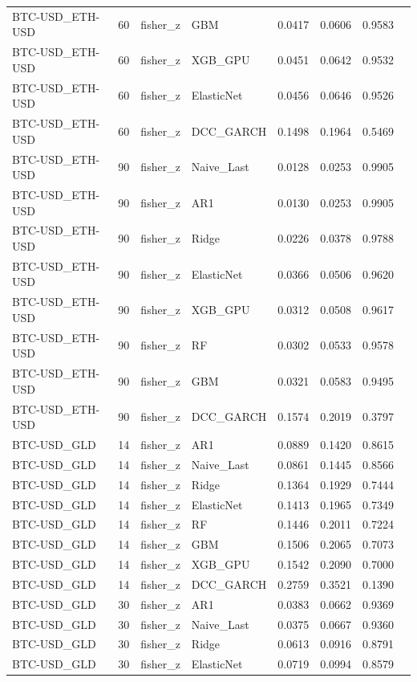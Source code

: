 \begin{table}[H]
\begin{tabular}{llllrrrr}
BTC-USD_ETH-USD & 60 & fisher_z & GBM & 0.0417 & 0.0606 & 0.9583 &  \\
BTC-USD_ETH-USD & 60 & fisher_z & XGB_GPU & 0.0451 & 0.0642 & 0.9532 &  \\
BTC-USD_ETH-USD & 60 & fisher_z & ElasticNet & 0.0456 & 0.0646 & 0.9526 &  \\
BTC-USD_ETH-USD & 60 & fisher_z & DCC_GARCH & 0.1498 & 0.1964 & 0.5469 &  \\
BTC-USD_ETH-USD & 90 & fisher_z & Naive_Last & 0.0128 & 0.0253 & 0.9905 &  \\
BTC-USD_ETH-USD & 90 & fisher_z & AR1 & 0.0130 & 0.0253 & 0.9905 &  \\
BTC-USD_ETH-USD & 90 & fisher_z & Ridge & 0.0226 & 0.0378 & 0.9788 &  \\
BTC-USD_ETH-USD & 90 & fisher_z & ElasticNet & 0.0366 & 0.0506 & 0.9620 &  \\
BTC-USD_ETH-USD & 90 & fisher_z & XGB_GPU & 0.0312 & 0.0508 & 0.9617 &  \\
BTC-USD_ETH-USD & 90 & fisher_z & RF & 0.0302 & 0.0533 & 0.9578 &  \\
BTC-USD_ETH-USD & 90 & fisher_z & GBM & 0.0321 & 0.0583 & 0.9495 &  \\
BTC-USD_ETH-USD & 90 & fisher_z & DCC_GARCH & 0.1574 & 0.2019 & 0.3797 &  \\
BTC-USD_GLD & 14 & fisher_z & AR1 & 0.0889 & 0.1420 & 0.8615 &  \\
BTC-USD_GLD & 14 & fisher_z & Naive_Last & 0.0861 & 0.1445 & 0.8566 &  \\
BTC-USD_GLD & 14 & fisher_z & Ridge & 0.1364 & 0.1929 & 0.7444 &  \\
BTC-USD_GLD & 14 & fisher_z & ElasticNet & 0.1413 & 0.1965 & 0.7349 &  \\
BTC-USD_GLD & 14 & fisher_z & RF & 0.1446 & 0.2011 & 0.7224 &  \\
BTC-USD_GLD & 14 & fisher_z & GBM & 0.1506 & 0.2065 & 0.7073 &  \\
BTC-USD_GLD & 14 & fisher_z & XGB_GPU & 0.1542 & 0.2090 & 0.7000 &  \\
BTC-USD_GLD & 14 & fisher_z & DCC_GARCH & 0.2759 & 0.3521 & 0.1390 &  \\
BTC-USD_GLD & 30 & fisher_z & AR1 & 0.0383 & 0.0662 & 0.9369 &  \\
BTC-USD_GLD & 30 & fisher_z & Naive_Last & 0.0375 & 0.0667 & 0.9360 &  \\
BTC-USD_GLD & 30 & fisher_z & Ridge & 0.0613 & 0.0916 & 0.8791 &  \\
BTC-USD_GLD & 30 & fisher_z & ElasticNet & 0.0719 & 0.0994 & 0.8579 &  \\

\end{tabular}
\end{table}
